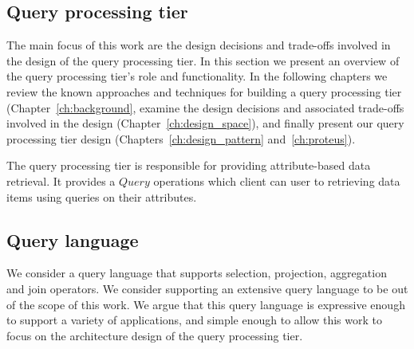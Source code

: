 \subsection{Query processing tier}
\label{subsec:query_prcessing_tier}
Τhe main focus of this work are the design decisions and trade-offs involved in the design of the query processing tier.
In this section we present an overview of the query processing tier's role and functionality.
In the following chapters we review the known approaches and techniques for building a query processing tier (Chapter~\ref{ch:background},
examine the design decisions and associated trade-offs involved in the design (Chapter~\ref{ch:design_space}),
and finally present our query processing tier design (Chapters~\ref{ch:design_pattern} and~\ref{ch:proteus}).

The query processing tier is responsible for providing attribute-based data retrieval.
It provides a $Query$ operations which client can user to retrieving data items using queries on their attributes.


\subsection{Query language}

We consider a query language that supports selection, projection, aggregation and join operators.
We consider supporting an extensive query language to be out of the scope of this work.
We argue that this query language is expressive enough to support a variety of applications,
and simple enough to allow this work to focus on the architecture design of the query processing tier.

